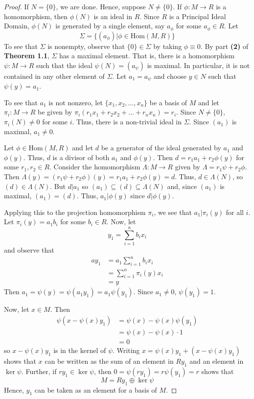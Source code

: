 \documentclass[12pt,leqno]{article}
\numberwithin{equation}{section}
\theoremstyle{definition}
\begin{document}
\begin{proof}
 If $N=\{0\}$, we are done. Hence, suppose $N\not=\{0\}$. If $\phi:M\to R$ is a homomorphism, then $\phi(N)$ is an ideal in $R$. Since $R$ is a Principal Ideal Domain, $\phi(N)$ is generated by a single element, say $a_{\phi}$ for some $a_{\phi}\in R$. Let \[\Sigma=\{(a_{\phi})|\phi\in\text{Hom}(M,R)\}\] To see that $\Sigma$ is nonempty, observe that $\{0\}\in\Sigma$ by taking $\phi\equiv0$. By part \textbf{(2)} of \textbf{Theorem 1.1}, $\Sigma$ has a maximal element. That is, there is a homomorphism $\psi:M\to R$ such that the ideal $\psi(N)=(a_{\psi})$ is maximal. In particular, it is not contained in any other element of $\Sigma$. Let $a_1=a_{\psi}$ and choose $y\in N$ such that $\psi(y)=a_1$.

To see that $a_1$ is not nonzero, let $\{x_1,x_2,\hdots,x_n\}$ be a basis of $M$ and let $\pi_i:M\to R$ be given by $\pi_i(r_1x_1+r_2x_2+\hdots+r_nx_n)=r_i$. Since $N\not=\{0\}$, $\pi_i(N)\not=0$ for some $i$. Thus, there is a non-trivial ideal in $\Sigma$. Since $(a_1)$ is maximal, $a_1\not=0$.

Let $\phi\in\text{Hom}(M,R)$ and let $d$ be a generator of the ideal generated by $a_1$ and $\phi(y)$. Thus, $d$ is a divisor of both $a_1$ and $\phi(y)$. Then $d=r_1a_1+r_2\phi(y)$ for some $r_1,r_2\in R$. Consider the homomorphism $\Lambda:M\to R$ given by $\Lambda=r_1\psi+r_2\phi$. Then $\Lambda(y)=(r_1\psi+r_2\phi)(y)=r_1a_1+r_2\phi(y)=d$. Thus, $d\in\Lambda(N)$, so $(d)\in\Lambda(N)$. But $d|a_1$ so $(a_1)\subseteq(d)\subseteq\Lambda(N)$ and, since $(a_1)$ is maximal, $(a_1)=(d)$. Thus, $a_1|\phi(y)$ since $d|\phi(y)$.

Applying this to the projection homomorphism $\pi_i$, we see that $a_1|\pi_i(y)$ for all $i$. Let $\pi_i(y)=a_1b_i$ for some $b_i\in R$. Now, let \[y_1=\sum_{i=1}^nb_ix_i\] and observe that \begin{align*}ay_1&=a_1\sum_{i=1}^nb_ix_i\\&=\sum_{i=1}^n\pi_i(y)x_i\\&=y\end{align*}Then $a_1=\psi(y)=\psi(a_1y_1)=a_1\psi(y_1)$. Since $a_1\not=0$, $\psi(y_1)=1$.

Now, let $x\in M$. Then \begin{align*}\psi(x-\psi(x)y_1)&=\psi(x)-\psi(x)\psi(y_1)\\&=\psi(x)-\psi(x)\cdot1\\&=0\end{align*} so $x-\psi(x)y_1$ is in the kernel of $\psi$. Writing $x=\psi(x)y_1+(x-\psi(x)y_1)$ shows that $x$ can be written as the sum of an element in $Ry_1$ and an element in $\ker\psi$. Further, if $ry_1\in\ker\psi
$, then $0=\psi(ry_1)=r\psi(y_1)=r$ shows that \[M=Ry_1\oplus\ker\psi\] Hence, $y_1$ can be taken as an element for a basis of $M$.


\end{proof}
\end{document}
